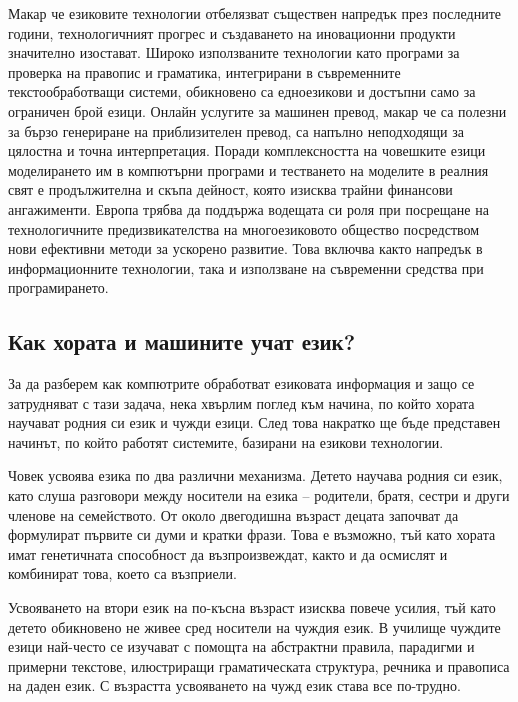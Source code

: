 \documentclass[]{../../metanetpaper}
\begin{document}
\begin{multicols}{2}
Макар че езиковите технологии отбелязват съществен
 напредък през последните години,
 технологичният прогрес и създаването на иновационни продукти значително изостават. Широко използваните технологии като програми за проверка на правопис и граматика, интегрирани в съвременните текстообработващи системи, 
обикновено са едноезикови и достъпни само за ограничен брой езици. 
Онлайн услугите за машинен превод, макар че са полезни за бързо генериране на приблизителен превод, са напълно неподходящи за цялостна и точна интерпретация. Поради комплексността на човешките езици моделирането им в компютърни програми и тестването на моделите в реалния свят е продължителна и скъпа дейност, която изисква трайни финансови ангажименти.  
Европа трябва да поддържа водещата си роля при посрещане на технологичните предизвикателства на многоезиковото общество посредством нови ефективни методи за ускорено развитие. Това включва както напредък в информационните технологии, така и използване на съвременни средства при програмирането.



\subsection{Как хората и машините учат език?}

За да разберем как компютрите обработват езиковата информация и защо се затрудняват с тази задача, нека хвърлим поглед към начина, по който хората научават родния си език и чужди езици. След това
 накратко ще бъде представен начинът, по който работят системите, базирани на езикови технологии.

Човек усвоява езика по два различни механизма. Детето
 научава родния си език, като слуша разговори между
 носители на езика – родители, братя, сестри и други
 членове на семейството. От около двегодишна възраст децата започват да формулират първите си думи и кратки фрази. Това е възможно, тъй като хората имат генетичната способност да възпроизвеждат, както и да осмислят и комбинират това, което са възприели.

Усвояването на втори език на по-късна възраст изисква
 повече усилия, тъй като детето обикновено не живее сред
 носители на чуждия език. В училище чуждите езици най-често се изучават с помощта на абстрактни правила, парадигми и примерни текстове, илюстриращи  граматическата структура, речника и правописа на даден език. С възрастта  усвояването на чужд език става все по-трудно.


\end{multicols}
\end{document}
